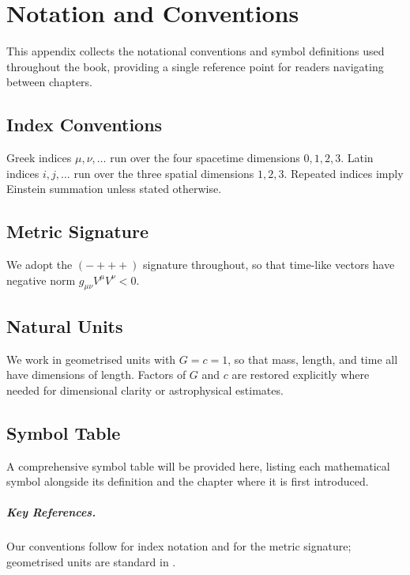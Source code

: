 \chapter{Notation and Conventions}
\label{app:notation}

This appendix collects the notational conventions and symbol definitions used
throughout the book, providing a single reference point for readers navigating
between chapters.

\section{Index Conventions}
\label{sec:not-indices}

Greek indices $\mu, \nu, \ldots$ run over the four spacetime dimensions
$0, 1, 2, 3$. Latin indices $i, j, \ldots$ run over the three spatial
dimensions $1, 2, 3$. Repeated indices imply Einstein summation unless stated
otherwise.

\section{Metric Signature}
\label{sec:not-signature}

We adopt the $({-}{+}{+}{+})$ signature throughout, so that time-like vectors
have negative norm $g_{\mu\nu} V^\mu V^\nu < 0$.

\section{Natural Units}
\label{sec:not-units}

We work in geometrised units with $G = c = 1$, so that mass, length, and time
all have dimensions of length. Factors of $G$ and $c$ are restored explicitly
where needed for dimensional clarity or astrophysical estimates.

\section{Symbol Table}
\label{sec:not-symbols}

A comprehensive symbol table will be provided here, listing each mathematical
symbol alongside its definition and the chapter where it is first introduced.

\paragraph{Key References.}
Our conventions follow \cite{MTW1973} for index notation and
\cite{Wald1984} for the metric signature; geometrised units are standard in
\cite{Baumgarte2010}.
